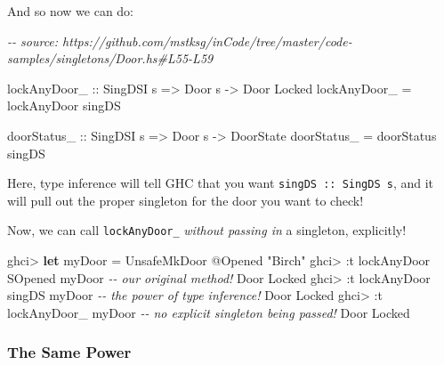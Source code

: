 \documentclass[]{article}
\newenvironment{Shaded}{}{}
\newcommand{\CommentTok}[1]{\textcolor[rgb]{0.38,0.63,0.69}{\textit{#1}}}
\newcommand{\DataTypeTok}[1]{\textcolor[rgb]{0.56,0.13,0.00}{#1}}
\newcommand{\KeywordTok}[1]{\textcolor[rgb]{0.00,0.44,0.13}{\textbf{#1}}}
\newcommand{\NormalTok}[1]{#1}
\newcommand{\OperatorTok}[1]{\textcolor[rgb]{0.40,0.40,0.40}{#1}}
\newcommand{\OtherTok}[1]{\textcolor[rgb]{0.00,0.44,0.13}{#1}}
\newcommand{\StringTok}[1]{\textcolor[rgb]{0.25,0.44,0.63}{#1}}
\begin{document}
And so now we can do:

\begin{Shaded}
\begin{Highlighting}[]
\CommentTok{{-}{-} source: https://github.com/mstksg/inCode/tree/master/code{-}samples/singletons/Door.hs\#L55{-}L59}

\OtherTok{lockAnyDoor\_ ::} \DataTypeTok{SingDSI}\NormalTok{ s }\OtherTok{=>} \DataTypeTok{Door}\NormalTok{ s }\OtherTok{{-}>} \DataTypeTok{Door} \DataTypeTok{\textquotesingle{}Locked}
\NormalTok{lockAnyDoor\_ }\OtherTok{=}\NormalTok{ lockAnyDoor singDS}

\OtherTok{doorStatus\_ ::} \DataTypeTok{SingDSI}\NormalTok{ s }\OtherTok{=>} \DataTypeTok{Door}\NormalTok{ s }\OtherTok{{-}>} \DataTypeTok{DoorState}
\NormalTok{doorStatus\_ }\OtherTok{=}\NormalTok{ doorStatus singDS}
\end{Highlighting}
\end{Shaded}

Here, type inference will tell GHC that you want \texttt{singDS\ ::\ SingDS\ s},
and it will pull out the proper singleton for the door you want to check!

Now, we can call \texttt{lockAnyDoor\_} \emph{without passing in} a singleton,
explicitly!

\begin{Shaded}
\begin{Highlighting}[]
\NormalTok{ghci}\OperatorTok{>} \KeywordTok{let}\NormalTok{ myDoor }\OtherTok{=} \DataTypeTok{UnsafeMkDoor} \OperatorTok{@}\DataTypeTok{\textquotesingle{}Opened} \StringTok{"Birch"}
\NormalTok{ghci}\OperatorTok{>} \OperatorTok{:}\NormalTok{t lockAnyDoor }\DataTypeTok{SOpened}\NormalTok{ myDoor }\CommentTok{{-}{-} our original method!}
\DataTypeTok{Door} \DataTypeTok{\textquotesingle{}Locked}
\NormalTok{ghci}\OperatorTok{>} \OperatorTok{:}\NormalTok{t lockAnyDoor singDS myDoor  }\CommentTok{{-}{-} the power of type inference!}
\DataTypeTok{Door} \DataTypeTok{\textquotesingle{}Locked}
\NormalTok{ghci}\OperatorTok{>} \OperatorTok{:}\NormalTok{t lockAnyDoor\_ myDoor        }\CommentTok{{-}{-} no explicit singleton being passed!}
\DataTypeTok{Door} \DataTypeTok{\textquotesingle{}Locked}
\end{Highlighting}
\end{Shaded}

\hypertarget{the-same-power}{%
\subsubsection{The Same Power}\label{the-same-power}}
\end{document}
